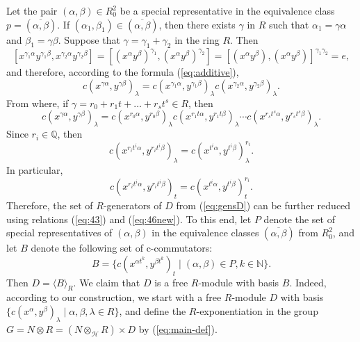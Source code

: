 \documentclass[11pt]{article}
\theoremstyle{definition}
\begin{document}
Let the pair $(\alpha, \beta) \in R_0^2$ be a special representative in the equivalence class $p = (\overline{\alpha,\beta})$.
If $(\alpha_1, \beta_1) \in (\overline{\alpha,\beta})$, then there exists $\gamma$ in $R$ such that $\alpha_1 = \gamma \alpha$ and $\beta_1 = \gamma \beta$. Suppose that $\gamma = \gamma_1 + \gamma_2$ in the ring $R$. Then 
$$
[x^{\gamma_1 \alpha }y^{\gamma_1 \beta }, x^{\gamma_2 \alpha }y^{\gamma_2 \beta }] = [(x^{\alpha}y^{\beta})^{\gamma_1}, (x^{\alpha }y^{\beta})^{\gamma_2}] = [(x^{\alpha}y^{\beta}), (x^{\alpha }y^{\beta})]^{\gamma_1\gamma_2} = e,
$$
and therefore, according to the formula (\ref{eq:additive}), 
$$
c(x^{\gamma \alpha },y^{\gamma \beta })_\lambda = c(x^{\gamma_1 \alpha },y^{\gamma_1\beta })_\lambda c(x^{\gamma_2\alpha },y^{\gamma_2\beta })_\lambda.
$$
From where, if $\gamma = r_0 + r_1 t + \ldots + r_s t^s \in R$, then 
\begin{equation}\label{eq:43}
    c(x^{\gamma \alpha}, y^{\gamma \beta})_\lambda = c(x^{r_0 \alpha}, y^{r_0 \beta})_\lambda c(x^{r_1 t \alpha}, y^{r_1 t \beta})_\lambda \cdots c(x^{r_s t^s \alpha}, y^{r_s t^s \beta})_\lambda.
\end{equation}
Since $r_i \in \mathbb{Q}$, then
\begin{equation}\label{eq:46}
    c(x^{r_i t^i \alpha}, y^{r_i t^i \beta})_\lambda =  c(x^{t^i \alpha}, y^{t^i \beta})_\lambda^{r_i}.
    \end{equation}
In particular,
\begin{equation}\label{eq:46new}
    c(x^{r_i t^i \alpha}, y^{r_i t^i \beta})_t =  c(x^{t^i \alpha}, y^{t^i \beta})_t^{r_i}.
    \end{equation}
Therefore, the set of $R$-generators of $D$ from (\ref{eq:gensD}) can be further reduced using relations (\ref{eq:43}) and (\ref{eq:46new}). To this end, let $P$ denote the set of special representatives of $(\alpha, \beta)$ in the equivalence classes $(\overline{\alpha,\beta})$ from $R_0^2$, and let $B$ denote the following set of c-commutators:
\begin{equation} \label{eq:gensDnew}
B = \{c(x^{\alpha t^k},y^{\beta t^k})_t \mid (\alpha, \beta) \in P, k \in \mathbb{N}\}.
\end{equation}
Then $D = \langle B\rangle_R.$ We claim that $D$ is a free $R$-module with basis $B$. Indeed, according to our construction, we start with a free $R$-module $D$ with basis $\{c(x^\alpha,y^\beta)_\lambda \mid \alpha, \beta, \lambda \in R \}$, and define the $R$-exponentiation in the group $G = N\otimes R = (N\otimes_{\mathcal{H}} R) \times D$ by (\ref{eq:main-def}).
\end{document}
